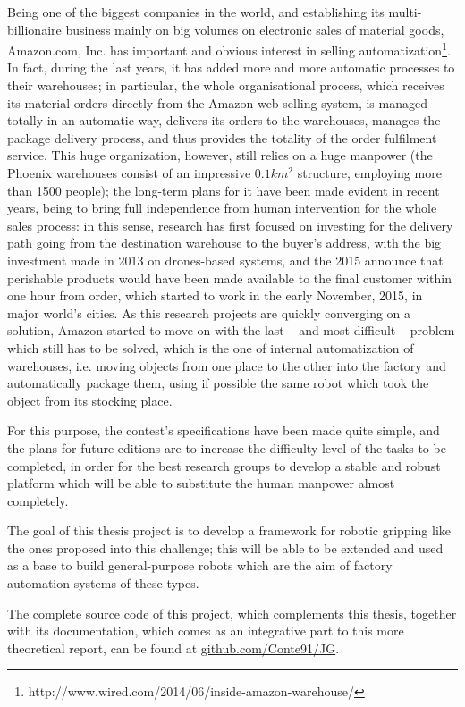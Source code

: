 Being one of the biggest companies in the world, and establishing its
multi-billionaire business mainly on big volumes on electronic sales
of material goods, Amazon.com, Inc. has important and obvious interest
in selling automatization\footnote{http://www.wired.com/2014/06/inside-amazon-warehouse/}. In fact, during the last years, it has
added more and more automatic processes to their warehouses; in
particular, the whole organisational process, which receives its
material orders directly from the Amazon web selling system, is
managed totally in an automatic way, delivers its orders to the
warehouses, manages the package delivery process, and thus provides
the totality of the order fulfilment service. This huge organization,
however, still relies on a huge manpower (the Phoenix warehouses
consist of an impressive $0.1\unit{km^2}$ structure, employing more
than 1500 people); the long-term plans for it have been made evident
in recent years, being to bring full independence from human intervention for the whole
sales process: in this sense, research has first focused on investing
for the delivery path going from the destination warehouse to the
buyer's address, with the big investment made in 2013 on drones-based
systems, and the 2015 announce that perishable products would have been
made available to the final customer within one hour from order, which
started to work in the early November, 2015, in major world's
cities. As this research projects are quickly converging on a
solution, Amazon started to move on with the last -- and most
difficult -- problem which still has to be solved, which is the one of
internal automatization of warehouses, i.e. moving objects from one
place to the other into the factory and automatically package them,
using if possible the same robot which took the object from its
stocking place.

For this purpose, the contest's specifications have been made quite simple, and the plans
for future editions are to increase the difficulty level of the tasks
to be completed, in order for the best research groups to develop a
stable and robust platform which will be able to substitute the human
manpower almost completely.

The goal of this thesis project is to develop a framework for robotic
gripping like the ones proposed into this challenge; this will be able
to be extended and used as a base to build general-purpose robots
which are the aim of factory automation systems of these types.

The complete source code of this project, which complements this
thesis, together with its documentation, which comes as an integrative part to this more theoretical report, can be found at \url{github.com/Conte91/JG}.

